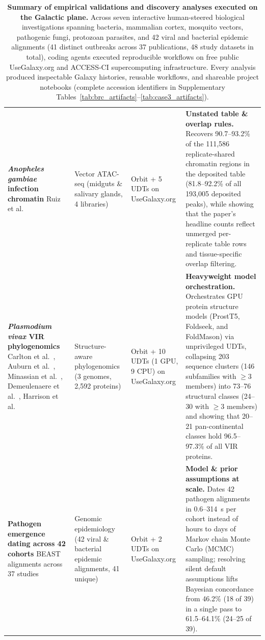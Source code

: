 \documentclass[11pt,letterpaper]{article}
\newcommand{\tool}[1]{\textsf{#1}}
\begin{document}
\begin{table}[!htbp]
\begin{tabularx}{\textwidth}{p{2.9cm}p{2.3cm}p{2.3cm}X}
\addlinespace[0.35em]
\textbf{\textit{Anopheles gambiae} infection chromatin} \newline Ruiz et al.\ \cite{ruiz2021} & Vector ATAC-seq \newline (midguts \& salivary glands, 4 libraries) & \tool{Orbit} + 5 UDTs on UseGalaxy.org & \textbf{Unstated table \& overlap rules.} Recovers 90.7--93.2\% of the 111,586 replicate-shared chromatin regions in the deposited table (81.8--92.2\% of all 193,005 deposited peaks), while showing that the paper's headline counts reflect unmerged per-replicate table rows and tissue-specific overlap filtering. \\
\addlinespace[0.35em]
\textbf{\textit{Plasmodium vivax} VIR phylogenomics} \newline Carlton et al.\ \cite{carlton2008}, Auburn et al.\ \cite{auburn2016}, Minassian et al.\ \cite{minassian2021pvw1}, Demeulenaere et al.\ \cite{demeulenaere2023}, Harrison et al.\ \cite{harrison2020} & Structure-aware phylogenomics \newline (3 genomes, 2,592 proteins) & \tool{Orbit} + 10 UDTs (1 GPU, 9 CPU) on UseGalaxy.org & \textbf{Heavyweight model orchestration.} Orchestrates GPU protein structure models (\tool{ProstT5}, \tool{Foldseek}, and \tool{FoldMason}) via unprivileged UDTs, collapsing 203 sequence clusters (146 subfamilies with $\ge 3$ members) into 73--76 structural classes (24--30 with $\ge 3$ members) and showing that 20--21 pan-continental classes hold 96.5--97.3\% of all VIR proteins. \\
\addlinespace[0.35em]
\textbf{Pathogen emergence dating across 42 cohorts} \newline 42 \tool{BEAST} alignments across 37 studies \cite{gire2014genomic, dudas2017virus, hill2019skygrid, faria2021genomics, pond2026hyphaeon} & Genomic epidemiology \newline (42 viral \& bacterial epidemic alignments, 41 unique) & \tool{Orbit} + 2 UDTs on UseGalaxy.org & \textbf{Model \& prior assumptions at scale.} Dates 42 pathogen alignments in 0.6--314~s per cohort instead of hours to days of Markov chain Monte Carlo (MCMC) sampling; resolving silent default assumptions lifts Bayesian concordance from 46.2\% (18 of 39) in a single pass to 61.5--64.1\% (24--25 of 39). \\
\bottomrule
\end{tabularx}
\caption{\textbf{Summary of empirical validations and discovery analyses executed on the Galactic plane.} Across seven interactive human-steered biological investigations spanning bacteria, mammalian cortex, mosquito vectors, pathogenic fungi, protozoan parasites, and 42 viral and bacterial epidemic alignments (41 distinct outbreaks across 37 publications, 48 study datasets in total), coding agents executed reproducible workflows on free public UseGalaxy.org and ACCESS-CI supercomputing infrastructure. Every analysis produced inspectable Galaxy histories, reusable workflows, and shareable project notebooks (complete accession identifiers in Supplementary Tables~\ref{tab:brc_artifacts}--\ref{tab:case3_artifacts}).}
\label{tab:validation_summary}
\end{table}
\end{document}

